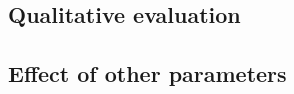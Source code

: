 




\subsection{Qualitative evaluation}
\label{sec:qual_eval}






\subsection{Effect of other parameters}
\label{sec:concepts:sec2}

